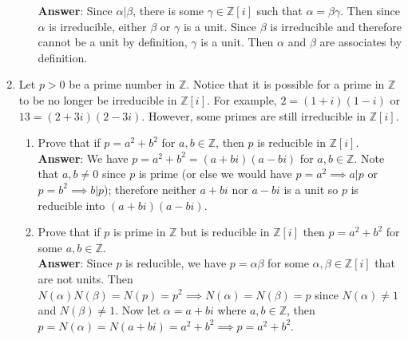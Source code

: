 \documentclass{article}
\begin{document}
\begin{enumerate}
\begin{enumerate}
                        \textbf{Answer}: Since $\alpha|\beta$, there is some $\gamma\in\mathbb{Z}[i]$ such that $\alpha=\beta\gamma$. Then since $\alpha$ is irreducible, either $\beta$ or $\gamma$ is a unit. Since $\beta$ is irreducible and therefore cannot be a unit by definition, $\gamma$ is a unit. Then $\alpha$ and $\beta$ are associates by definition.
            \end{enumerate}
      \item Let $p>0$ be a prime number in $\mathbb{Z}$. Notice that it is possible for a prime in $\mathbb{Z}$ to be no longer be irreducible in $\mathbb{Z}[i]$. For example, $2=(1+i)(1-i)$ or $13=(2+3i)(2-3i)$. However, some primes are still irreducible in $\mathbb{Z}[i]$.
            \begin{enumerate}
                  \item Prove that if $p=a^2+b^2$ for $a,b\in\mathbb{Z}$, then $p$ is reducible in $\mathbb{Z}[i]$.\\
                        \textbf{Answer}: We have $p=a^2+b^2=(a+bi)(a-bi)$ for $a,b\in\mathbb{Z}$. Note that $a,b\neq 0$ since $p$ is prime (or else we would have $p=a^2\implies a|p$ or $p=b^2\implies b|p$); therefore neither $a+bi$ nor $a-bi$ is a unit so $p$ is reducible into $(a+bi)(a-bi)$.
                  \item Prove that if $p$ is prime in $\mathbb{Z}$ but is reducible in $\mathbb{Z}[i]$ then $p=a^2+b^2$ for some $a,b\in\mathbb{Z}$.\\
                        \textbf{Answer}: Since $p$ is reducible, we have $p=\alpha\beta$ for some $\alpha,\beta\in\mathbb{Z}[i]$ that are not units. Then $N(\alpha)N(\beta)=N(p)=p^2\implies N(\alpha)=N(\beta)=p$ since $N(\alpha)\neq 1$ and $N(\beta)\neq 1$. Now let $\alpha=a+bi$ where $a,b\in\mathbb{Z}$, then $p=N(\alpha)=N(a+bi)=a^2+b^2\implies p=a^2+b^2$.
            \end{enumerate}
\end{enumerate}
\end{document}
